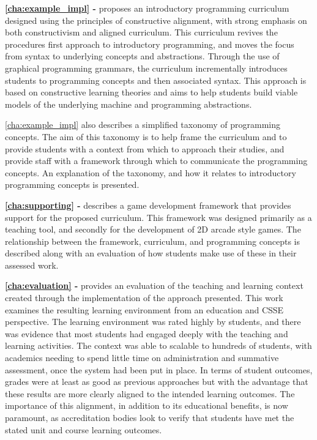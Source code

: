 \textbf{\cref{cha:example_impl} - } proposes an introductory programming curriculum designed using the principles of constructive alignment, with strong emphasis on both constructivism and aligned curriculum. This curriculum revives the procedures first approach to introductory programming, and moves the focus from syntax to underlying concepts and abstractions. Through the use of graphical programming grammars, the curriculum incrementally introduces students to programming concepts and then associated syntax. This approach is based on constructive learning theories and aims to help students build viable models of the underlying machine and programming abstractions. 
 
\cref{cha:example_impl} also describes a simplified taxonomy of programming concepts. The aim of this taxonomy is to help frame the curriculum and to provide students with a context from which to approach their studies, and provide staff with a framework through which to communicate the programming concepts. An explanation of the taxonomy, and how it relates to introductory programming concepts is presented.

\textbf{\cref{cha:supporting} - } describes a game development framework that provides support for the proposed curriculum. This framework was designed primarily as a teaching tool, and secondly for the development of 2D arcade style games. The relationship between the framework, curriculum, and programming concepts is described along with an evaluation of how students make use of these in their assessed work.

\textbf{\cref{cha:evaluation} - } provides an evaluation of the teaching and learning context created through the implementation of the approach presented. This work examines the resulting learning environment from an education and CSSE perspective. The learning environment was rated highly by students, and there was evidence that most students had engaged deeply with the teaching and learning activities. The context was able to scalable to hundreds of students, with academics needing to spend little time on administration and summative assessment, once the system had been put in place. In terms of student outcomes, grades were at least as good as previous approaches but with the advantage that these results are more clearly aligned to the intended learning outcomes. The importance of this alignment, in addition to its educational benefits, is now paramount, as accreditation bodies look to verify that students have met the stated unit and course learning outcomes. 

